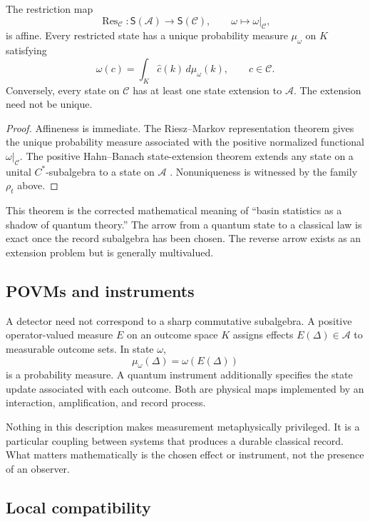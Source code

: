 \documentclass[11pt]{article}
\newcommand{\A}{\mathcal A}
\newcommand{\C}{\mathcal C}
\newcommand{\Res}{\operatorname{Res}}
\newcommand{\States}{\mathsf S}
\begin{document}
\begin{theorem}
\label{thm:interface}
The restriction map
\[
 \Res_{\C}:\States(\A)\longrightarrow\States(\C),
 \qquad
 \omega\longmapsto\omega|_{\C},
\]
is affine.  Every restricted state has a unique probability measure
\(\mu_\omega\) on \(K\) satisfying
\[
 \omega(c)=\int_K\widehat c(k)\,d\mu_\omega(k),
 \qquad c\in\C.
\]
Conversely, every state on \(\C\) has at least one state extension to
\(\A\).  The extension need not be unique.
\end{theorem}

\begin{proof}
Affineness is immediate.  The Riesz--Markov representation theorem gives
the unique probability measure associated with the positive normalized
functional \(\omega|_{\C}\).  The positive Hahn--Banach state-extension
theorem extends any state on a unital \(C^*\)-subalgebra to a state on
\(\A\) \cite{bratteli_robinson}.  Nonuniqueness is witnessed by the family
\(\rho_t\) above.
\end{proof}

This theorem is the corrected mathematical meaning of ``basin statistics
as a shadow of quantum theory.''  The arrow from a quantum state to a
classical law is exact once the record subalgebra has been chosen.  The
reverse arrow exists as an extension problem but is generally multivalued.

\subsection{POVMs and instruments}

A detector need not correspond to a sharp commutative subalgebra.  A
positive operator-valued measure \(E\) on an outcome space \(K\) assigns
effects \(E(\Delta)\in\A\) to measurable outcome sets.  In state \(\omega\),
\[
 \mu_\omega(\Delta)=\omega(E(\Delta))
\]
is a probability measure.  A quantum instrument additionally specifies
the state update associated with each outcome.  Both are physical maps
implemented by an interaction, amplification, and record process.

Nothing in this description makes measurement metaphysically privileged.
It is a particular coupling between systems that produces a durable
classical record.  What matters mathematically is the chosen effect or
instrument, not the presence of an observer.

\subsection{Local compatibility}
\end{document}
